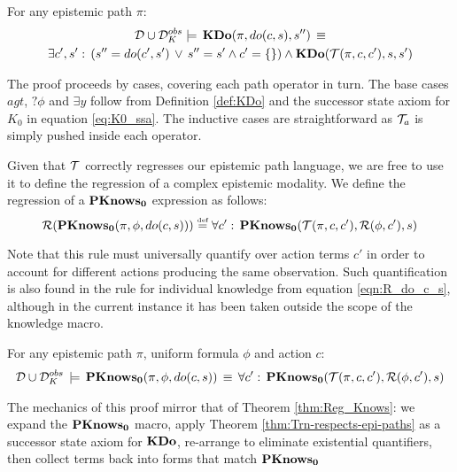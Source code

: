\begin{thm}
\label{thm:Trn-respects-epi-paths}For any epistemic path $\pi$:\begin{multline*}
\mathcal{D}\cup\mathcal{D}_{K}^{obs}\models\,\mathbf{KDo}(\pi,do(c,s),s'')\,\equiv\\
\exists c',s':\,\left(s''=do(c',s')\,\vee\, s''=s'\wedge c'=\{\}\right)\wedge\mathbf{KDo}(\mathcal{T}(\pi,c,c'),s,s')\end{multline*}

\end{thm}
\begin{proofsketch}
The proof proceeds by cases, covering each path operator in turn.
The base cases $agt$, $?\phi$ and $\exists y$ follow from Definition
\ref{def:KDo} and the successor state axiom for $K_{0}$ in equation
\eqref{eq:K0_ssa}. The inductive cases are straightforward as $\mathcal{T}_{a}$
is simply pushed inside each operator.
\end{proofsketch}
Given that $\mathcal{T}$ correctly regresses our epistemic path language,
we are free to use it to define the regression of a complex epistemic
modality. We define the regression of a $\mathbf{PKnows_{0}}$ expression as
follows:\[
\mathcal{R}(\mathbf{PKnows_{0}}(\pi,\phi,do(c,s)))\stackrel{\mbox{\tiny def}}{=}\forall c':\,\mathbf{PKnows_{0}}(\mathcal{T}(\pi,c,c'),\mathcal{R}(\phi,c'),s)\]


Note that this rule must universally quantify over action terms $c'$
in order to account for different actions producing the same observation.
Such quantification is also found in the rule for individual knowledge
from equation \eqref{eqn:R_do_c_s}, although in the current instance
it has been taken outside the scope of the knowledge macro. 

\begin{thm}
\label{thm:Reg_PKnowsZ}For any epistemic path $\pi$, uniform formula
$\phi$ and action $c$:\begin{gather*}
\mathcal{D}\cup\mathcal{D}_{K}^{obs}\,\models\,\mathbf{PKnows_{0}}(\pi,\phi,do(c,s))\,\equiv\,\forall c':\,\mathbf{PKnows_{0}}(\mathcal{T}(\pi,c,c'),\mathcal{R}(\phi,c'),s)\end{gather*}

\end{thm}
\begin{proofsketch}
The mechanics of this proof mirror that of Theorem \ref{thm:Reg_Knows}:
we expand the $\mathbf{PKnows_{0}}$ macro, apply Theorem \ref{thm:Trn-respects-epi-paths}
as a successor state axiom for $\mathbf{KDo}$, re-arrange to eliminate existential
quantifiers, then collect terms back into forms that match $\mathbf{PKnows_{0}}$
\end{proofsketch}

